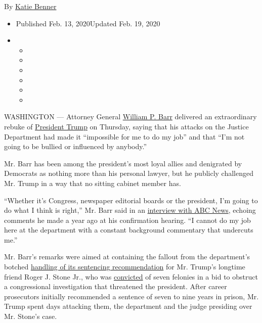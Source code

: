 By \href{https://www.nytimes3xbfgragh.onion/by/katie-benner}{Katie
Benner}

\begin{itemize}
\item
  Published Feb. 13, 2020Updated Feb. 19, 2020
\item
  \begin{itemize}
  \item
  \item
  \item
  \item
  \item
  \item
  \end{itemize}
\end{itemize}

WASHINGTON --- Attorney General
\href{https://www.nytimes3xbfgragh.onion/2020/02/19/us/politics/trump-barr-justice-department.html}{William
P. Barr} delivered an extraordinary rebuke of
\href{https://www.nytimes3xbfgragh.onion/2020/02/19/us/politics/trump-barr-justice-department.html}{President
Trump} on Thursday, saying that his attacks on the Justice Department
had made it ``impossible for me to do my job'' and that ``I'm not going
to be bullied or influenced by anybody.''

Mr. Barr has been among the president's most loyal allies and denigrated
by Democrats as nothing more than his personal lawyer, but he publicly
challenged Mr. Trump in a way that no sitting cabinet member has.

``Whether it's Congress, newspaper editorial boards or the president,
I'm going to do what I think is right,'' Mr. Barr said in an
\href{https://abcnews.go.com/Politics/barr-blasts-trumps-tweets-stone-case-impossible-job/story?id=68963276\&cid=social_twitter_wnt}{interview
with ABC News}, echoing comments he made a year ago at his confirmation
hearing. ``I cannot do my job here at the department with a constant
background commentary that undercuts me.''

Mr. Barr's remarks were aimed at containing the fallout from the
department's botched
\href{https://www.nytimes3xbfgragh.onion/2020/02/12/us/politics/trump-stone.html}{handling
of its sentencing recommendation} for Mr. Trump's longtime friend Roger
J. Stone Jr., who was
\href{https://www.nytimes3xbfgragh.onion/2019/11/15/us/politics/roger-stone-trial-guilty.html}{convicted}
of seven felonies in a bid to obstruct a congressional investigation
that threatened the president. After career prosecutors initially
recommended a sentence of seven to nine years in prison, Mr. Trump spent
days attacking them, the department and the judge presiding over Mr.
Stone's case.

